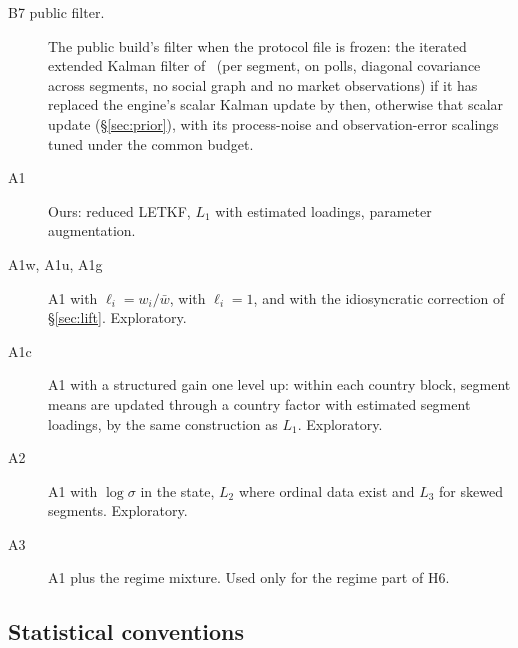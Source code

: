 \documentclass[10pt]{article}
\theoremstyle{remark}
\begin{document}
\begin{description}
\item[B7 public filter.] The public build's filter when the protocol file is frozen: the iterated extended Kalman filter of~\cite{rw_askaworld} (per segment, on polls, diagonal covariance across segments, no social graph and no market observations) if it has replaced the engine's scalar Kalman update by then, otherwise that scalar update (\S\ref{sec:prior}), with its process-noise and observation-error scalings tuned under the common budget.
\item[A1] Ours: reduced LETKF, $L_1$ with estimated loadings, parameter augmentation.
\item[A1w, A1u, A1g] A1 with $\ell_i=w_i/\bar w$, with $\ell_i=1$, and with the idiosyncratic correction of \S\ref{sec:lift}. Exploratory.
\item[A1c] A1 with a structured gain one level up: within each country block, segment means are updated through a country factor with estimated segment loadings, by the same construction as $L_1$. Exploratory.
\item[A2] A1 with $\log\sigma$ in the state, $L_2$ where ordinal data exist and $L_3$ for skewed segments. Exploratory.
\item[A3] A1 plus the regime mixture. Used only for the regime part of H6.
\end{description}

\subsection{Statistical conventions}
\label{sec:conventions}
\end{document}
